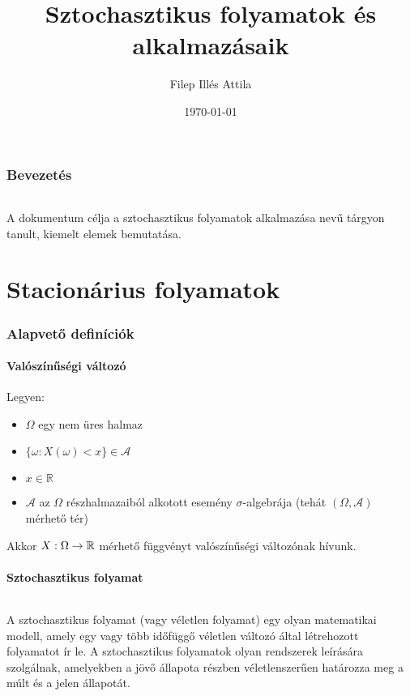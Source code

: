 \documentclass[11pt,a4paper]{article}
\title{Sztochasztikus folyamatok és alkalmazásaik}
\date{\today}
\author{Filep Illés Attila}
\begin{document}
 	\maketitle
  	\newpage

	\begin{abstract}

	\end{abstract}
	\tableofcontents
	\section*{Bevezetés}
		\paragraph{}
			A dokumentum célja a sztochasztikus folyamatok alkalmazása nevű tárgyon tanult, kiemelt elemek bemutatása.
	\part{Stacionárius folyamatok}
		\section{Alapvető definíciók}
			\subsection{Valószínűségi változó}
				Legyen:
				\begin{itemize}
					\item $\Omega$ egy nem üres halmaz
					\item $\{\omega : X(\omega) < x\} \in \mathcal{A}$
					\item $x \in \mathbb{R}$
					\item $\mathcal{A}$ az $\Omega$ részhalmazaiból alkotott esemény $\sigma$-algebrája (tehát $(\Omega, \mathcal{A})$ mérhető tér)
				\end{itemize}
				Akkor $X: \Omega \to \Bbb{R}$ mérhető függvényt valószínűségi változónak hívunk.
			\subsection{Sztochasztikus folyamat}
				\paragraph{}
					A sztochasztikus folyamat (vagy véletlen folyamat) egy olyan matematikai modell, amely egy vagy több időfüggő véletlen változó által létrehozott folyamatot ír le. A sztochasztikus folyamatok olyan rendszerek leírására szolgálnak, amelyekben a jövő állapota részben véletlenszerűen határozza meg a múlt és a jelen állapotát.
\end{document}

